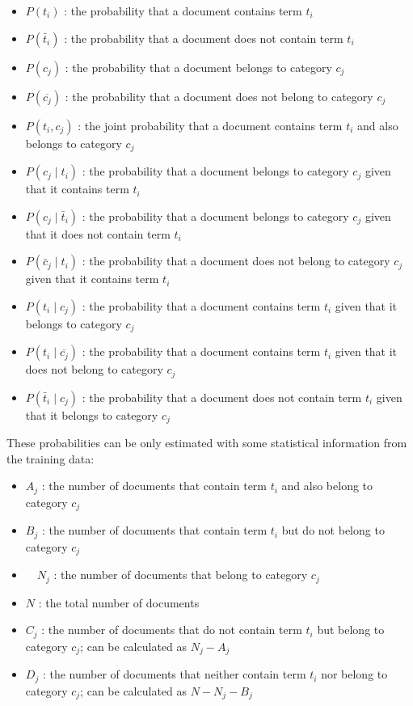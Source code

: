 \documentclass[10pt]{book}
\begin{document}
\begin{itemize}
  \item $P\left(t_{i}\right)$ : the probability that a document contains term $t_{i}$
  \item $P\left(\bar{t}_{i}\right)$ : the probability that a document does not contain term $t_{i}$
  \item $P\left(c_{j}\right)$ : the probability that a document belongs to category $c_{j}$
  \item $P\left(\overline{c_{j}}\right)$ : the probability that a document does not belong to category $c_{j}$
  \item $P\left(t_{i}, c_{j}\right)$ : the joint probability that a document contains term $t_{i}$ and also belongs to category $c_{j}$
  \item $P\left(c_{j} \mid t_{i}\right)$ : the probability that a document belongs to category $c_{j}$ given that it contains term $t_{i}$
  \item $P\left(c_{j} \mid \bar{t}_{i}\right)$ : the probability that a document belongs to category $c_{j}$ given that it does not contain term $t_{i}$
  \item $P\left(\bar{c}_{j} \mid t_{i}\right)$ : the probability that a document does not belong to category $c_{j}$ given that it contains term $t_{i}$
  \item $P\left(t_{i} \mid c_{j}\right)$ : the probability that a document contains term $t_{i}$ given that it belongs to category $c_{j}$
  \item $P\left(t_{i} \mid \overline{c_{j}}\right)$ : the probability that a document contains term $t_{i}$ given that it does not belong to category $c_{j}$
  \item $P\left(\bar{t}_{i} \mid c_{j}\right)$ : the probability that a document does not contain term $t_{i}$ given that it belongs to category $c_{j}$
\end{itemize}

These probabilities can be only estimated with some statistical information from the training data:

\begin{itemize}
  \item $A_{j}$ : the number of documents that contain term $t_{i}$ and also belong to category $c_{j}$
  \item $B_{j}$ : the number of documents that contain term $t_{i}$ but do not belong to category $c_{j}$
  \item $\quad N_{j}$ : the number of documents that belong to category $c_{j}$
  \item $N$ : the total number of documents
  \item $C_{j}$ : the number of documents that do not contain term $t_{i}$ but belong to category $c_{j}$; can be calculated as $N_{j}-A_{j}$
  \item $D_{j}$ : the number of documents that neither contain term $t_{i}$ nor belong to category $c_{j}$; can be calculated as $N-N_{j}-B_{j}$
\end{itemize}
\end{document}
